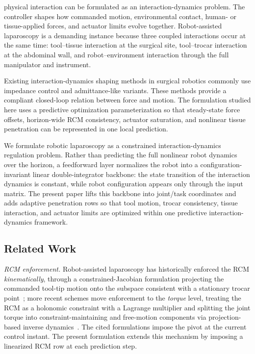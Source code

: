 physical interaction can be formulated as an interaction-dynamics problem. The controller shapes how commanded motion, environmental contact, human- or tissue-applied forces, and actuator limits evolve together. Robot-assisted laparoscopy is a demanding instance because three coupled interactions occur at the same time: tool--tissue interaction at the surgical site, tool--trocar interaction at the abdominal wall, and robot--environment interaction through the full manipulator and instrument.

Existing interaction-dynamics shaping methods in surgical robotics commonly use impedance control and admittance-like variants. These methods provide a compliant closed-loop relation between force and motion. The formulation studied here uses a predictive optimization parameterization so that steady-state force offsets, horizon-wide RCM consistency, actuator saturation, and nonlinear tissue penetration can be represented in one local prediction.

We formulate robotic laparoscopy as a constrained interaction-dynamics regulation problem. Rather than predicting the full nonlinear robot dynamics over the horizon, a feedforward layer normalizes the robot into a configuration-invariant linear double-integrator backbone: the state transition of the interaction dynamics is constant, while robot configuration appears only through the input matrix. The present paper lifts this backbone into joint/task coordinates and adds adaptive penetration rows so that tool motion, trocar consistency, tissue interaction, and actuator limits are optimized within one predictive interaction-dynamics framework.

\subsection{Related Work}

\emph{RCM enforcement.} Robot-assisted laparoscopy has historically enforced the RCM \emph{kinematically}, through a constrained-Jacobian 
formulation projecting the commanded tool-tip motion onto the subspace consistent with a stationary trocar point~\cite{aghakhani2013}; 
more recent schemes move enforcement to the \emph{torque} level, treating the RCM as a holonomic constraint with a Lagrange multiplier 
and splitting the joint torque into constraint-maintaining and free-motion components via projection-based inverse dynamics~\cite{sandoval2018}. 
The cited formulations impose the pivot at the current control instant. The
present formulation extends this mechanism by imposing a linearized RCM row at
each prediction step.

